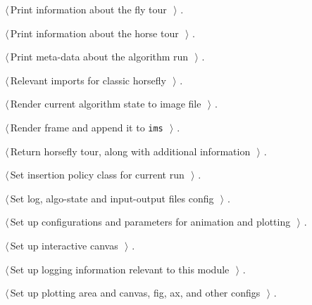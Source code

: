 \documentclass[11.5pt]{report}
\begin{document}
{\begin{list}{}{\setlength{\itemsep}{-\parsep}\setlength{\itemindent}{-\leftmargin}}
\item $\langle\,$Print information about the fly tour\nobreak\ {\footnotesize {}}$\,\rangle$ {\footnotesize {\NWtxtRefIn} .}
\item $\langle\,$Print information about the horse tour\nobreak\ {\footnotesize {}}$\,\rangle$ {\footnotesize {\NWtxtRefIn} .}
\item $\langle\,$Print meta-data about the algorithm run\nobreak\ {\footnotesize {}}$\,\rangle$ {\footnotesize {\NWtxtRefIn} .}
\item $\langle\,$Relevant imports for classic horsefly\nobreak\ {\footnotesize {}}$\,\rangle$ {\footnotesize {\NWtxtRefIn} .}
\item $\langle\,$Render current algorithm state to image file\nobreak\ {\footnotesize {}}$\,\rangle$ {\footnotesize {\NWtxtRefIn} .}
\item $\langle\,$Render frame and append it to \verb|ims|\nobreak\ {\footnotesize {}}$\,\rangle$ {\footnotesize {\NWtxtRefIn} .}
\item $\langle\,$Return horsefly tour, along with additional information\nobreak\ {\footnotesize {}}$\,\rangle$ {\footnotesize {\NWtxtRefIn} .}
\item $\langle\,$Set insertion policy class for current run\nobreak\ {\footnotesize {}}$\,\rangle$ {\footnotesize {\NWtxtRefIn} .}
\item $\langle\,$Set log, algo-state and input-output files config\nobreak\ {\footnotesize {}}$\,\rangle$ {\footnotesize {\NWtxtRefIn} .}
\item $\langle\,$Set up configurations and parameters for animation and plotting\nobreak\ {\footnotesize {}}$\,\rangle$ {\footnotesize {\NWtxtRefIn} .}
\item $\langle\,$Set up interactive canvas\nobreak\ {\footnotesize {}}$\,\rangle$ {\footnotesize {\NWtxtRefIn} .}
\item $\langle\,$Set up logging information relevant to this module\nobreak\ {\footnotesize {}}$\,\rangle$ {\footnotesize {\NWtxtRefIn} .}
\item $\langle\,$Set up plotting area and canvas, fig, ax, and other configs\nobreak\ {\footnotesize {}}$\,\rangle$ {\footnotesize {\NWtxtRefIn} .}

\end{list}}
\end{document}
